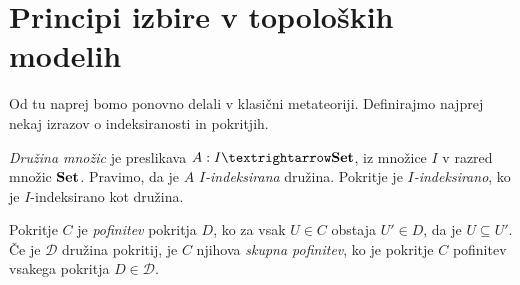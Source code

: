 \section{Principi izbire v topoloških modelih}\label{sec:izbire}

Od tu naprej bomo ponovno delali v klasični metateoriji. Definirajmo najprej
nekaj izrazov o indeksiranosti in pokritjih.
\begin{definicija}
  \emph{Družina množic} je preslikava \(A : I → \setcat\), iz množice \(I\) v
  razred množic \(\mathbf{Set}\). Pravimo, da je \(A\) \emph{\(I\)-indeksirana}
  družina. Pokritje je \emph{\(I\)-indeksirano}, ko je \(I\)-indeksirano kot
  družina.
\end{definicija}
\begin{definicija}
  Pokritje \(C\) je \emph{pofinitev} pokritja \(D\), ko za vsak \(U ∈ C\)
  obstaja \(U' ∈ D\), da je \(U ⊆ U'\).
  Če je \(𝒟\) družina pokritij, je \(C\) njihova \emph{skupna pofinitev}, ko je
  pokritje \(C\) pofinitev vsakega pokritja \(D ∈ 𝒟\).
\end{definicija}

